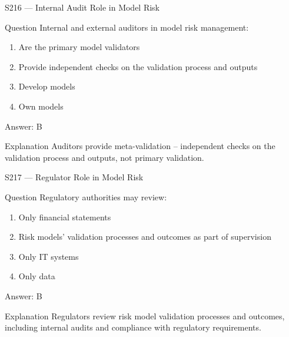 \documentclass[aspectratio=169,8pt]{beamer}
\begin{document}
	\begin{frame}{S216 --- Internal Audit Role in Model Risk}
		\begin{block}{Question}
			Internal and external auditors in model risk management:
			\begin{enumerate}
				\item Are the primary model validators
				\item Provide independent checks on the validation process and outputs
				\item Develop models
				\item Own models
			\end{enumerate}
		\end{block}
		\begin{exampleblock}{Answer: B}\end{exampleblock}
		\begin{block}{Explanation}
			Auditors provide meta-validation -- independent checks on the validation process and outputs, not primary validation.
		\end{block}
	\end{frame}
	
	\begin{frame}{S217 --- Regulator Role in Model Risk}
		\begin{block}{Question}
			Regulatory authorities may review:
			\begin{enumerate}
				\item Only financial statements
				\item Risk models' validation processes and outcomes as part of supervision
				\item Only IT systems
				\item Only data
			\end{enumerate}
		\end{block}
		\begin{exampleblock}{Answer: B}\end{exampleblock}
		\begin{block}{Explanation}
			Regulators review risk model validation processes and outcomes, including internal audits and compliance with regulatory requirements.
		\end{block}
	\end{frame}
	
\end{document}
